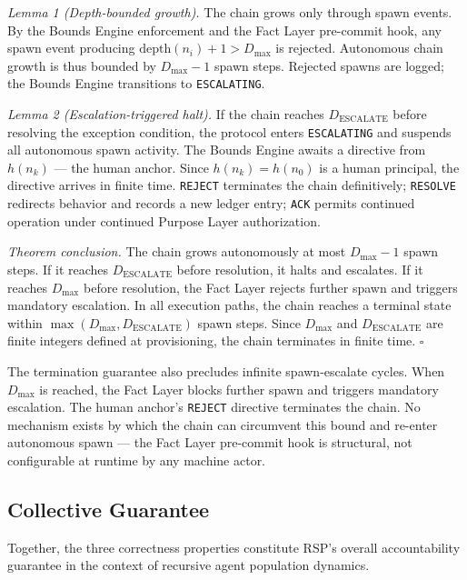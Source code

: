 \medskip
\textit{Lemma 1 (Depth-bounded growth).} The chain grows only through spawn events. By the Bounds Engine enforcement and the Fact Layer pre-commit hook, any spawn event producing $\text{depth}(n_i) + 1 > D_{\max}$ is rejected. Autonomous chain growth is thus bounded by $D_{\max} - 1$ spawn steps. Rejected spawns are logged; the Bounds Engine transitions to \texttt{ESCALATING}.

\medskip
\textit{Lemma 2 (Escalation-triggered halt).} If the chain reaches $D_{\mathrm{ESCALATE}}$ before resolving the exception condition, the protocol enters \texttt{ESCALATING} and suspends all autonomous spawn activity. The Bounds Engine awaits a directive from $h(n_k)$ — the human anchor. Since $h(n_k) = h(n_0)$ is a human principal, the directive arrives in finite time. \texttt{REJECT} terminates the chain definitively; \texttt{RESOLVE} redirects behavior and records a new ledger entry; \texttt{ACK} permits continued operation under continued Purpose Layer authorization.

\medskip
\textit{Theorem conclusion.} The chain grows autonomously at most $D_{\max} - 1$ spawn steps. If it reaches $D_{\mathrm{ESCALATE}}$ before resolution, it halts and escalates. If it reaches $D_{\max}$ before resolution, the Fact Layer rejects further spawn and triggers mandatory escalation. In all execution paths, the chain reaches a terminal state within $\max(D_{\max}, D_{\mathrm{ESCALATE}})$ spawn steps. Since $D_{\max}$ and $D_{\mathrm{ESCALATE}}$ are finite integers defined at provisioning, the chain terminates in finite time. $\square$

The termination guarantee also precludes infinite spawn-escalate cycles. When $D_{\max}$ is reached, the Fact Layer blocks further spawn and triggers mandatory escalation. The human anchor's \texttt{REJECT} directive terminates the chain. No mechanism exists by which the chain can circumvent this bound and re-enter autonomous spawn — the Fact Layer pre-commit hook is structural, not configurable at runtime by any machine actor.

\subsection{Collective Guarantee}
\label{sec:rs-collective}

Together, the three correctness properties constitute RSP's overall accountability guarantee in the context of recursive agent population dynamics.

